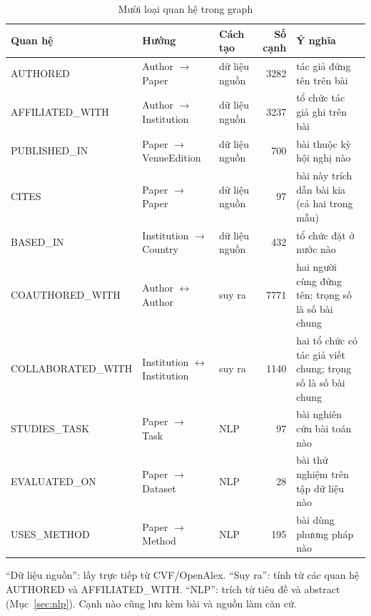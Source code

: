 \documentclass[11pt,a4paper]{article}
\begin{document}
\begin{table}[H]
\footnotesize\centering
\renewcommand{\arraystretch}{1.2}
\caption{Mười loại quan hệ trong graph}
\label{tab:b1}
\begin{tabularx}{\textwidth}{@{}l >{\raggedright\arraybackslash}p{3.2cm} l r >{\raggedright\arraybackslash}X@{}}
\toprule
\textbf{Quan hệ} & \textbf{Hướng} & \textbf{Cách tạo} & \textbf{Số cạnh} & \textbf{Ý nghĩa}\\
\midrule
AUTHORED & Author $\to$ Paper & dữ liệu nguồn & 3282 & tác giả đứng tên trên bài\\
AFFILIATED\_\allowbreak WITH & Author $\to$ Institution & dữ liệu nguồn & 3237 & tổ chức tác giả ghi trên bài\\
PUBLISHED\_\allowbreak IN & Paper $\to$ VenueEdition & dữ liệu nguồn & 700 & bài thuộc kỳ hội nghị nào\\
CITES & Paper $\to$ Paper & dữ liệu nguồn & 97 & bài này trích dẫn bài kia (cả hai trong mẫu)\\
BASED\_\allowbreak IN & Institution $\to$ Country & dữ liệu nguồn & 432 & tổ chức đặt ở nước nào\\
COAUTHORED\_\allowbreak WITH & Author $\leftrightarrow$ Author & suy ra & 7771 & hai người cùng đứng tên; trọng số là số bài chung\\
COLLABORATED\_\allowbreak WITH & Institution $\leftrightarrow$ Institution & suy ra & 1140 & hai tổ chức có tác giả viết chung; trọng số là số bài chung\\
STUDIES\_\allowbreak TASK & Paper $\to$ Task & NLP & 97 & bài nghiên cứu bài toán nào\\
EVALUATED\_\allowbreak ON & Paper $\to$ Dataset & NLP & 28 & bài thử nghiệm trên tập dữ liệu nào\\
USES\_\allowbreak METHOD & Paper $\to$ Method & NLP & 195 & bài dùng phương pháp nào\\
\bottomrule
\end{tabularx}
\end{table}

{\footnotesize ``Dữ liệu nguồn'': lấy trực tiếp từ CVF/OpenAlex. ``Suy ra'': tính từ các quan hệ AUTHORED và AFFILIATED\_WITH. ``NLP'': trích từ tiêu đề và abstract (Mục~\ref{sec:nlp}). Cạnh nào cũng lưu kèm bài và nguồn làm căn cứ.\par}
\end{document}
